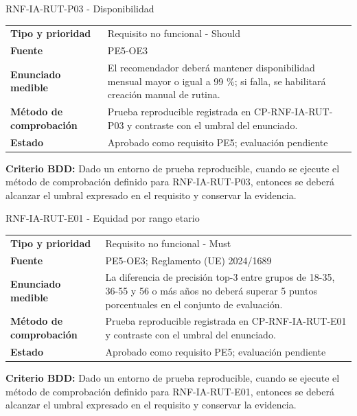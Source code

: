 \documentclass[11pt,a4paper]{article}
\begin{document}
\begin{reqbox}[colframe=Teal]{RNF-IA-RUT-P03 - Disponibilidad}
\begin{tabularx}{\textwidth}{>{\bfseries}p{3.2cm}Y}
Tipo y prioridad & Requisito no funcional - Should \\
Fuente & PE5-OE3 \\
Enunciado medible & El recomendador deberá mantener disponibilidad mensual mayor o igual a 99 \%; si falla, se habilitará creación manual de rutina. \\
Método de comprobación & Prueba reproducible registrada en CP-RNF-IA-RUT-P03 y contraste con el umbral del enunciado. \\
Estado & Aprobado como requisito PE5; evaluación pendiente \\
\end{tabularx}
\textbf{Criterio BDD:} Dado un entorno de prueba reproducible, cuando se ejecute el método de comprobación definido para RNF-IA-RUT-P03, entonces se deberá alcanzar el umbral expresado en el requisito y conservar la evidencia.
\end{reqbox}


\begin{reqbox}[colframe=Teal]{RNF-IA-RUT-E01 - Equidad por rango etario}
\begin{tabularx}{\textwidth}{>{\bfseries}p{3.2cm}Y}
Tipo y prioridad & Requisito no funcional - Must \\
Fuente & PE5-OE3; Reglamento (UE) 2024/1689 \\
Enunciado medible & La diferencia de precisión top-3 entre grupos de 18-35, 36-55 y 56 o más años no deberá superar 5 puntos porcentuales en el conjunto de evaluación. \\
Método de comprobación & Prueba reproducible registrada en CP-RNF-IA-RUT-E01 y contraste con el umbral del enunciado. \\
Estado & Aprobado como requisito PE5; evaluación pendiente \\
\end{tabularx}
\textbf{Criterio BDD:} Dado un entorno de prueba reproducible, cuando se ejecute el método de comprobación definido para RNF-IA-RUT-E01, entonces se deberá alcanzar el umbral expresado en el requisito y conservar la evidencia.
\end{reqbox}
\end{document}
